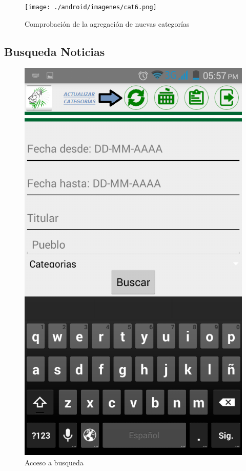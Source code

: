 \begin{figure}
\centering
\texttt{[image: ./android/imagenes/cat6.png]}
\caption{Comprobación de la agregación de nuevas categorías}
\label{cat6}
\end{figure}

\subsection{Busqueda Noticias}

\begin{figure}
\centering
\includegraphics[scale=0.5]{./android/imagenes/bus1.png}
\caption{Acceso a busqueda}
\label{bus1}
\end{figure}

